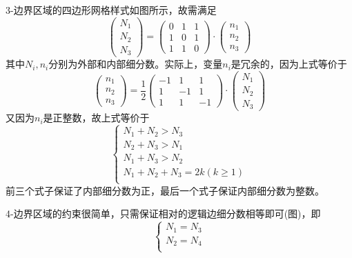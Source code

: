 3-边界区域的四边形网格样式如图所示，故需满足
\begin{equation}
\left(
\begin{array}{c}
N_1 \\ 
N_2 \\ 
N_3
\end{array}
\right) 
=
\left(
\begin{array}{ccc}
0 & 1 & 1 \\ 
1 & 0 & 1 \\ 
1 & 1 & 0
\end{array}
\right)
\cdot
\left(
\begin{array}{c}
n_1 \\ 
n_2 \\ 
n_3
\end{array} 
\right)
\end{equation}
其中$N_i,n_i$分别为外部和内部细分数。实际上，变量$n_i$是冗余的，因为上式等价于
\begin{equation}
\left(
\begin{array}{c}
n_1 \\ 
n_2 \\ 
n_3
\end{array} 
\right)
=
\frac{1}{2}
\left(
\begin{array}{ccc}
-1 & 1 & 1 \\ 
1 & -1 & 1 \\ 
1 & 1 & -1
\end{array}
\right)
\cdot
\left(
\begin{array}{c}
N_1 \\ 
N_2 \\ 
N_3
\end{array}
\right) 
\end{equation}
又因为$n_i$是正整数，故上式等价于
 \begin{equation}        \label{equ:3side}                  
 \begin{cases}
 N_1+N_2>N_3\\
 N_2+N_3>N_1\\
 N_1+N_3>N_2\\
 N_1+N_2+N_3=2k(k\geq 1)\\
 \end{cases}
 \end{equation}
 前三个式子保证了内部细分数为正，最后一个式子保证内部细分数为整数。
 
 4-边界区域的约束很简单，只需保证相对的逻辑边细分数相等即可(图)，即
 \begin{equation}\label{equ:4side}
\begin{cases}
N_1=N_3\\
N_2=N_4\\
\end{cases}
 \end{equation}
 
